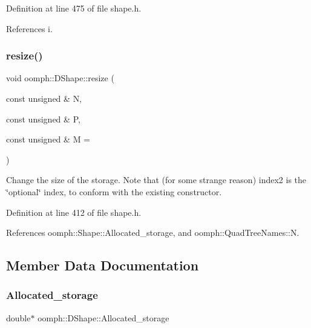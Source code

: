 Definition at line 475 of file shape.\+h.



References i.

\mbox{\label{classoomph_1_1DShape_a8332362ef8b25fbdad13fe2b81b5cca9}} 
\subsubsection{\texorpdfstring{resize()}{resize()}}
{\footnotesize\ttfamily void oomph\+::\+D\+Shape\+::resize (\begin{DoxyParamCaption}\item[{const unsigned \&}]{N,  }\item[{const unsigned \&}]{P,  }\item[{const unsigned \&}]{M = {} }\end{DoxyParamCaption})\hspace{0.3cm}{\ttfamily [inline]}}

Change the size of the storage. Note that (for some strange reason) index2 is the \char`\"{}optional\char`\"{} index, to conform with the existing constructor. 

Definition at line 412 of file shape.\+h.



References oomph\+::\+Shape\+::\+Allocated\+\_\+storage, and oomph\+::\+Quad\+Tree\+Names\+::N.



\subsection{Member Data Documentation}
\mbox{\label{classoomph_1_1DShape_a7b5d34f932015974cdf764f44e04fafb}} 
\subsubsection{\texorpdfstring{Allocated\+\_\+storage}{Allocated\_storage}}
{\footnotesize\ttfamily double$\ast$ oomph\+::\+D\+Shape\+::\+Allocated\+\_\+storage\hspace{0.3cm}{\ttfamily [private]}}



